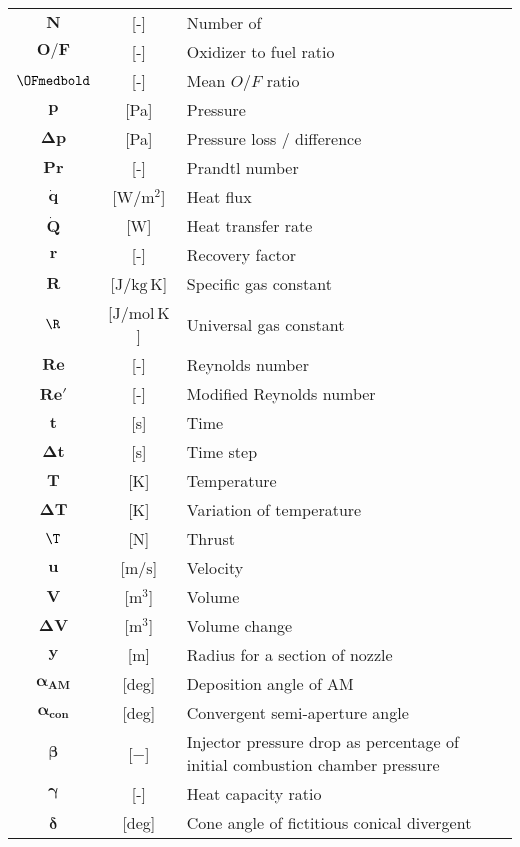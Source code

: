 \begin{multicols}{2}
{\begin{xltabular}{\linewidth}{cc>{\raggedright\arraybackslash}X}
		$\boldsymbol{N}$ & [-] & Number of \\
		$\boldsymbol{O/F}$ & [-] & Oxidizer to fuel ratio \\
		$\OFmedbold$ & [-] & Mean $O/F$ ratio \\ 
		$\boldsymbol{p}$ & [Pa] & Pressure \\
		$\boldsymbol{\Delta p}$ & [Pa] & Pressure loss / difference \\
		$\boldsymbol{Pr}$ & [-] & Prandtl number \\
		$\boldsymbol{\dot{q}}$ & [$\textrm{W} / \textrm{m}^2$] & Heat flux \\
		$\boldsymbol{\dot{Q}}$ & [W] & Heat transfer rate \\
		$\boldsymbol{r}$ & [-] & Recovery factor \\
		$\boldsymbol{R}$ & [$\textrm{J} / \textrm{kg} \, \textrm{K}$] & Specific gas constant \\
		$\boldsymbol{\R}$ & [$\textrm{J} / \textrm{mol} \, \textrm{K}$] & Universal gas constant \\
		$\boldsymbol{Re}$ & [-] & Reynolds number \\
		$\boldsymbol{Re'}$ & [-] & Modified Reynolds number \\
		$\boldsymbol{t}$ & [s] & Time \\
		$\boldsymbol{\Delta t}$ & [s] & Time step \\
		$\boldsymbol{T}$ & [K] & Temperature \\
		$\boldsymbol{\Delta T}$ & [K] & Variation of temperature \\
		$\boldsymbol{\T}$ & [N] & Thrust \\
		$\boldsymbol{u}$ & [$\textrm{m} / \textrm{s}$] & Velocity \\
		$\boldsymbol{V}$ & [$\textrm{m}^3$] & Volume \\
		$\boldsymbol{\Delta V}$ & [$\textrm{m}^3$] & Volume change \\
		$\boldsymbol{y}$ & [$\textrm{m}$] & Radius for a section of nozzle \\
		$\boldsymbol{\alpha_{AM}}$ & [deg] & Deposition angle of AM \\
		$\boldsymbol{\alpha_{con}}$ & [deg] & Convergent semi-aperture angle \\
		$\boldsymbol{\beta}$ & [$-$] & Injector pressure drop as percentage of initial combustion chamber pressure \\ 
		$\boldsymbol{\gamma}$ & [-] & Heat capacity ratio \\
		$\boldsymbol{\delta}$ & [deg] & Cone angle of fictitious conical divergent \\

\end{xltabular}}
\end{multicols}
